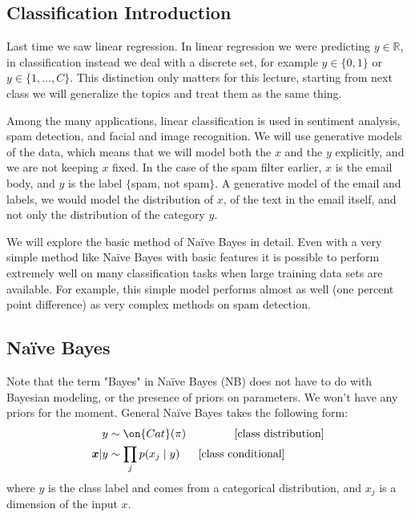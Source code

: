 \documentclass{article}
\renewcommand{\v}{\boldsymbol}
\begin{document}

\subsection{Classification Introduction}



Last time we saw linear regression. In linear regression we were predicting $y \in \mathbb{R}$, in classification instead we deal with a discrete set, for example $y \in \{ 0,1\}$ or $y\in \{1, \ldots, C\}$. This distinction only matters for this lecture, starting from next class we will generalize the topics and treat them as the same thing.

\smallskip

Among the many applications, linear classification is used in sentiment analysis, spam detection, and facial and image recognition. We will use generative models of the data, which means that we will model both the $x$ and the $y$ explicitly, and we are not keeping $x$ fixed. In the case of the spam filter earlier, $x$ is the email body, and $y$ is the label $\{$spam, not spam$\}$. A generative model of the email and labels, we would model the distribution of $x$, of the text in the email itself, and not only the distribution of the category $y$.

\smallskip

We will explore the basic method of Na\"ive Bayes in detail. Even with a very simple method like Na\"ive Bayes with basic features it is possible to perform extremely well on many classification tasks when large training data sets are available. For example, this simple model performs almost as well (one percent point difference) as very complex methods on spam detection.

\subsection{Na\"ive Bayes}
Note that the term "Bayes" in Na\"ive Bayes (NB) does not have to do with Bayesian modeling, or the presence of priors on parameters. We won't have any priors for the moment.  General Na\"ive Bayes takes the following form:
\begin{align*}
    y &\sim \on{Cat}(\pi) ~~~~~~~~~~~~~ \text{[class distribution]}\\
    \v x|y &\sim \prod_{j}p(x_j \mid y) ~~~~~ \text{[class conditional]}
\end{align*}
where $y$ is the class label and comes from a categorical distribution, and $x_j$ is a dimension of the input $x$.
\end{document}
